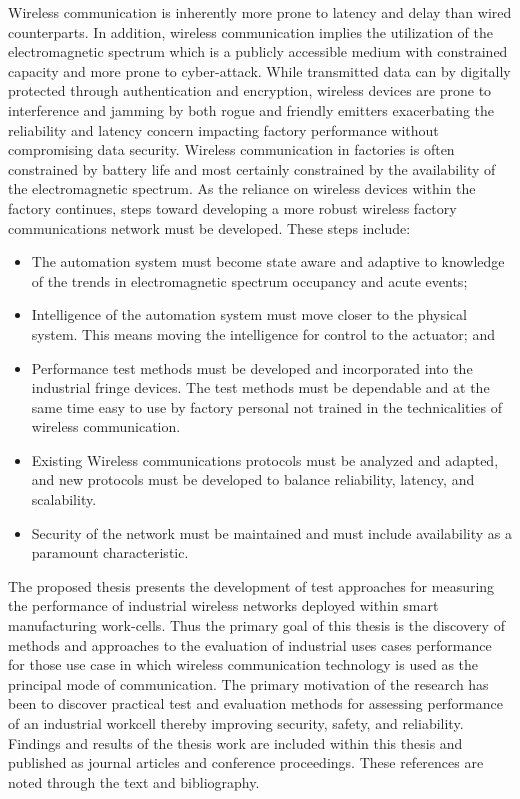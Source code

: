 Wireless communication is inherently more prone to latency and delay than wired counterparts.  In addition, wireless communication implies the utilization of the electromagnetic spectrum which is a publicly accessible medium with constrained capacity and more prone to cyber-attack.  While transmitted data can by digitally protected through authentication and encryption, wireless devices are prone to interference and jamming by both rogue and friendly emitters exacerbating the reliability and latency concern impacting factory performance without compromising data security.  Wireless communication in factories is often constrained by battery life and most certainly constrained by the availability of the electromagnetic spectrum.   As the reliance on wireless devices within the factory continues, steps toward developing a more robust wireless factory communications network must be developed. These steps include:

\begin{itemize}
	\item The automation system must become state aware and adaptive to knowledge of the trends in electromagnetic spectrum occupancy and acute events; 
	\item Intelligence of the automation system must move closer to the physical system.  This means moving the intelligence for control to the actuator; and  
	\item Performance test methods must be developed and incorporated into the industrial fringe devices.  The test methods must be dependable and at the same time easy to use by factory personal not trained in the technicalities of wireless communication. 
	\item Existing Wireless communications protocols must be analyzed and adapted, and new protocols must be developed to balance reliability, latency, and scalability. 
	\item Security of the network must be maintained and must include availability as a paramount characteristic.
\end{itemize}

The proposed thesis presents the development of test approaches for measuring the performance of industrial wireless networks deployed within smart manufacturing work-cells.  Thus the primary goal of this thesis is the discovery of methods and approaches to the evaluation of industrial uses cases performance for those use case in which wireless communication technology is used as the principal mode of communication.  The primary motivation of the research has been to discover practical test and evaluation methods for assessing performance of an industrial workcell thereby improving security, safety, and reliability.   Findings and results of the thesis work are included within this thesis and published as journal articles and conference proceedings.  These references are noted through the text and bibliography.  

